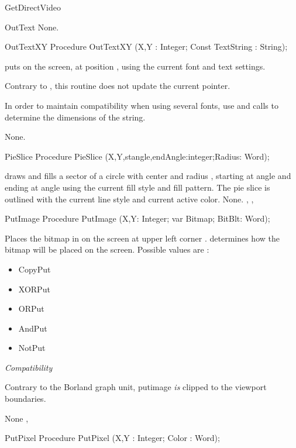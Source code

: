 \begin{function}{GetDirectVideo}
\begin{procedure}{OutText}
\Errors
None.
\SeeAlso
{}
\end{procedure}
\begin{procedure}{OutTextXY}
\Declaration
Procedure OutTextXY (X,Y : Integer; Const TextString : String);

\Description
{} puts  on the screen, at position ,
using the current font and text settings.

Contrary to  , this routine does not update the current pointer.

In order to maintain compatibility when using several fonts, use 
and  calls to determine the dimensions of the string.

\Errors
None.
\SeeAlso
{}
\end{procedure}
\begin{procedure}{PieSlice}
\Declaration
Procedure PieSlice (X,Y,stangle,endAngle:integer;Radius: Word);

\Description
{}
draws and fills a sector of a circle with center  and radius
, starting at angle  and ending at angle 
using the current fill style and fill pattern. The pie slice is outlined
with the current line style and current active color.
\Errors
None.
\SeeAlso
{}, , 
\end{procedure}
\begin{procedure}{PutImage}
\Declaration
Procedure PutImage (X,Y: Integer; var Bitmap; BitBlt: Word);

\Description
{}
Places the bitmap in  on the screen at upper left
corner .  determines how the bitmap
will be placed on the screen. Possible values are :
\begin{itemize}
\item CopyPut
\item XORPut
\item ORPut
\item AndPut
\item NotPut
\end{itemize}

\textit{Compatibility}

Contrary to the Borland graph unit, putimage \textit{is} clipped to the
viewport boundaries.

\Errors
None
\SeeAlso
{},
\end{procedure}
\begin{procedure}{PutPixel}
\Declaration
Procedure PutPixel (X,Y : Integer; Color : Word);


\end{procedure}
\end{function}
